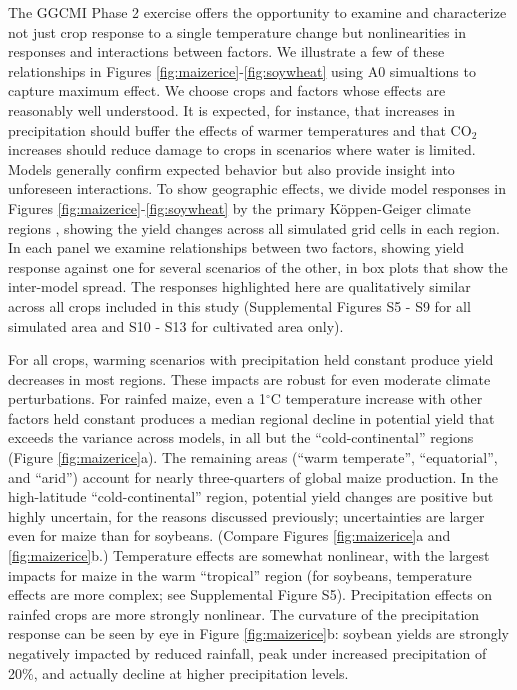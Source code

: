 \documentclass[gmd, manuscript]{copernicus} %
\begin{document}
The GGCMI Phase 2 exercise offers the opportunity to examine and characterize not just crop response to a single temperature change but nonlinearities in responses and interactions between factors. 
We illustrate a few of these relationships in Figures \ref{fig:maizerice}-\ref{fig:soywheat} using A0 simualtions to capture maximum effect.
We choose crops and factors whose effects are reasonably well understood. 
It is expected, for instance, that increases in precipitation should buffer the effects of warmer temperatures and that CO$_2$ increases should reduce damage to crops in scenarios where water is limited. 
Models generally confirm expected behavior but also provide insight into unforeseen interactions. 
To show geographic effects, we divide model responses in Figures \ref{fig:maizerice}-\ref{fig:soywheat} by the primary K\"{o}ppen-Geiger climate regions \citep{rubel2010}, showing the yield changes across all simulated grid cells in each region. 
In each panel we examine relationships between two factors, showing yield response against one for several scenarios of the other, in box plots that show the inter-model spread. 
The responses highlighted here are qualitatively similar across all crops included in this study (Supplemental Figures S5 - S9 for all simulated area and S10 - S13 for cultivated area only). 

For all crops, warming scenarios with precipitation held constant produce yield decreases in most regions. 
These impacts are robust for even moderate climate perturbations. 
For rainfed maize, even a 1$^\circ$C temperature increase with other factors held constant produces a median regional decline in potential yield that exceeds the variance across models, in all but the ``cold-continental'' regions (Figure \ref{fig:maizerice}a). 
The remaining areas (``warm temperate'', ``equatorial'', and ``arid'') account for nearly three-quarters of global maize production. 
In the high-latitude ``cold-continental'' region, potential yield changes are positive but highly uncertain, for the reasons discussed previously; uncertainties are larger even for maize than for soybeans. 
(Compare Figures \ref{fig:maizerice}a and \ref{fig:maizerice}b.) 
Temperature effects are somewhat nonlinear, with the largest impacts for maize in the warm ``tropical'' region (for soybeans, temperature effects are more complex; see Supplemental Figure S5). 
Precipitation effects on rainfed crops are more strongly nonlinear. 
The curvature of the precipitation response can be seen by eye in Figure \ref{fig:maizerice}b: soybean yields are strongly negatively impacted by reduced rainfall, peak under increased precipitation of 20\%, and actually decline at higher precipitation levels. 
\end{document}
